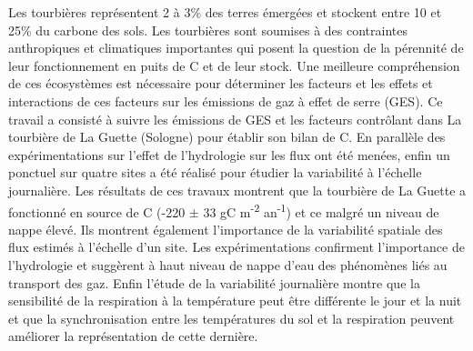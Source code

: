 {\begin{framed}
	\begin{minipage}{\dimexpr\textwidth-2\fboxrule-2\fboxsep}
	Les tourbières représentent 2 à 3\% des terres émergées et stockent entre 10 et 25\% du carbone des sols. 
	Les tourbières sont soumises à des contraintes anthropiques et climatiques importantes qui posent la question de la pérennité de leur fonctionnement en puits de C et de leur stock. Une meilleure compréhension de ces écosystèmes est nécessaire pour déterminer les facteurs et les effets et interactions de ces facteurs sur les émissions de gaz à effet de serre (GES).
	Ce travail a consisté à suivre les émissions de GES et les facteurs contrôlant dans La tourbière de La Guette (Sologne) pour établir son bilan de C. En parallèle des expérimentations sur l'effet de l'hydrologie sur les flux ont été menées, enfin un ponctuel sur quatre sites a été réalisé pour étudier la variabilité à l'échelle journalière.
	Les résultats de ces travaux montrent que la tourbière de La Guette a fonctionné en source de C (-220 $\pm$ 33 gC m\textsuperscript{-2} an\textsuperscript{-1}) et ce malgré un niveau de nappe élevé. %
	Ils montrent également l'importance de la variabilité spatiale des flux estimés à l'échelle d'un site. Les expérimentations confirment l'importance de l'hydrologie et suggèrent à haut niveau de nappe d'eau des phénomènes liés au transport des gaz. Enfin l'étude de la variabilité journalière montre que la sensibilité de la respiration à la température peut être différente le jour et la nuit et que la synchronisation entre les températures du sol et la respiration peuvent améliorer la représentation de cette dernière.

\end{minipage}
\end{framed}}
